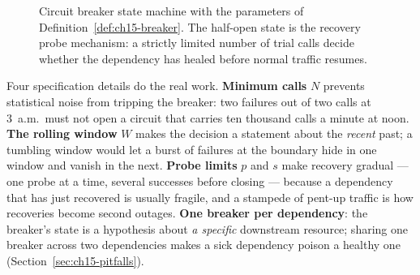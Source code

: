 \begin{figure}[h]
\centering
{}
\caption{Circuit breaker state machine with the parameters of
Definition~\ref{def:ch15-breaker}. The half-open state is the recovery
probe mechanism: a strictly limited number of trial calls decide whether
the dependency has healed before normal traffic resumes.}
\label{fig:ch15-breaker-fsm}
\end{figure}

Four specification details do the real work. \textbf{Minimum calls} $N$
prevents statistical noise from tripping the breaker: two failures out of
two calls at 3~a.m.\ must not open a circuit that carries ten thousand
calls a minute at noon. \textbf{The rolling window} $W$ makes the decision
a statement about the \emph{recent} past; a tumbling window would let a
burst of failures at the boundary hide in one window and vanish in the
next. \textbf{Probe limits} $p$ and $s$ make recovery gradual --- one probe
at a time, several successes before closing --- because a dependency that
has just recovered is usually fragile, and a stampede of pent-up traffic is
how recoveries become second outages. \textbf{One breaker per dependency}:
the breaker's state is a hypothesis about \emph{a specific} downstream
resource; sharing one breaker across two dependencies makes a sick
dependency poison a healthy one (Section~\ref{sec:ch15-pitfalls}).

